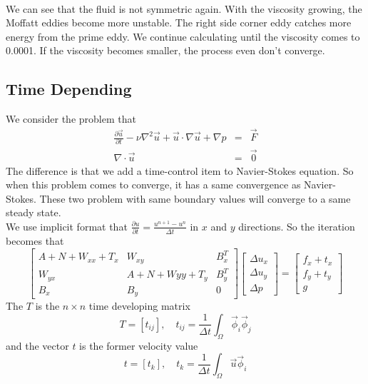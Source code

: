 \documentclass[a4paper]{article}
\begin{document}
\\
We can see that the fluid is not symmetric again. With the viscosity growing, the Moffatt eddies become more unstable. The right side corner eddy catches more energy from the prime eddy. We continue calculating until the viscosity comes to 0.0001. If the viscosity becomes smaller, the process even don't converge.
\subsection{Time Depending}
We consider the problem that
\begin{equation}
\begin{array}{rcl}
\frac{\partial\vec{u}}{\partial t}-\nu \nabla^2 \vec{u} + \vec{u}\cdot \nabla \vec{u} + \nabla p &=& \vec{F} \\
\nabla \cdot \vec{u} &=& \vec{0}
\label{eq::Timedepending-problem}
\end{array}
\end{equation}
The difference is that we add a time-control item to Navier-Stokes equation. So when this problem comes to converge, it has a same convergence as Navier-Stokes. These two problem with same boundary values will converge to a same steady state.\\
We use implicit format that $\frac{\partial u}{\partial t} = \frac{u^{n+1}-u^{n}}{\Delta t}$ in $x$ and $y$ directions.
So the iteration becomes that
\begin{equation}
\left[ \begin{array}{ccc}
A + N +W_{xx} + T_x & W_{xy} & B_x^T \\
W_{yx} & A +N +W{yy} + T_y& B_y^T \\
B_x & B_y & 0
\end{array}
\right]
\left[\begin{array}{ccc}
\Delta u_x\\
\Delta u_y\\
\Delta p
\end{array}
\right]=
\left[\begin{array}{ccc}
f_x + t_x\\
f_y + t_y\\
g
\end{array}
\right]
\label{Timedepending}
\end{equation}
The $T$ is the $n\times n$ time developing matrix
\begin{equation}
T = [t_{ij}],\quad t_{ij}=\frac{1}{\Delta t}\int_{\Omega}\vec{\phi}_i\vec{\phi}_j
\end{equation}
and the vector $t$ is the former velocity value
\begin{equation}
t = [t_{k}],\quad t_{k}=\frac{1}{\Delta t}\int_{\Omega}\vec{u}\vec{\phi}_i
\end{equation}
\end{document}
